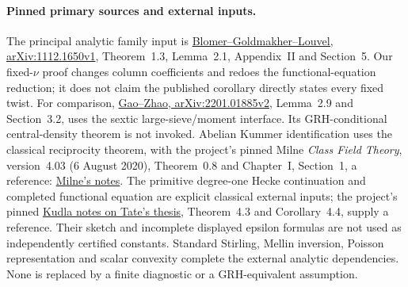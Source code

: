 \documentclass[11pt]{article}
\theoremstyle{definition}\newtheorem{definition}[theorem]{Definition}
\theoremstyle{remark}\newtheorem{remark}[theorem]{Remark}
\begin{document}
\paragraph{Pinned primary sources and external inputs.}
The principal analytic family input is
\href{https://arxiv.org/pdf/1112.1650v1}{Blomer--Goldmakher--Louvel,
arXiv:1112.1650v1}, Theorem~1.3, Lemma~2.1, Appendix~II and Section~5.
Our fixed-$\nu$ proof changes column coefficients and redoes the
functional-equation reduction; it does not claim the published
corollary directly states every fixed twist.
For comparison,
\href{https://arxiv.org/pdf/2201.01885v2}{Gao--Zhao,
arXiv:2201.01885v2}, Lemma~2.9 and Section~3.2, uses the sextic
large-sieve/moment interface. Its GRH-conditional central-density theorem
is not invoked. Abelian Kummer identification uses the classical
reciprocity theorem, with the project's pinned Milne \emph{Class Field
Theory}, version~4.03 (6 August 2020), Theorem~0.8 and Chapter~I,
Section~1, a reference:
\href{https://www.jmilne.org/math/CourseNotes/CFT.pdf}{Milne's notes}.
The primitive degree-one Hecke continuation and completed functional
equation are explicit classical external inputs; the project's pinned
\href{https://u.cs.biu.ac.il/~reznikov/courses/kudla-1.pdf}{Kudla notes
on Tate's thesis}, Theorem~4.3 and Corollary~4.4, supply a reference.
Their sketch and incomplete displayed epsilon formulas are not used as
independently certified constants. Standard Stirling, Mellin inversion,
Poisson representation and scalar convexity complete the external
analytic dependencies. None is replaced by a finite diagnostic or a
GRH-equivalent assumption.
\end{document}

